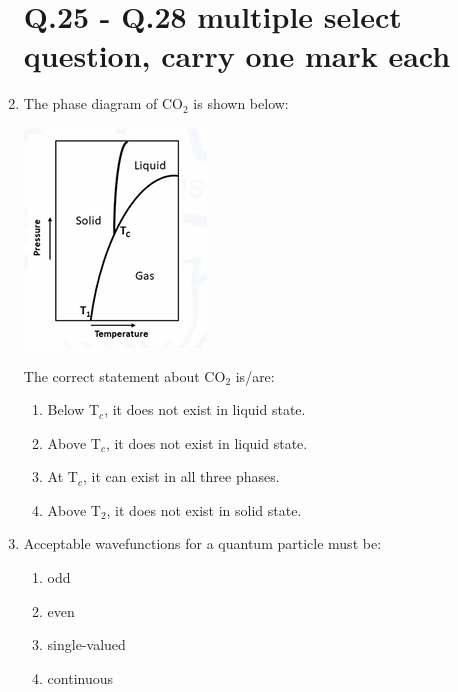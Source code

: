 \documentclass[journal,12pt,onecolumn]{IEEEtran}
\begin{document}
\begin{enumerate}
    \hfill{}
\section*{Q.25 - Q.28 multiple select question, carry one mark each}

    \item The phase diagram of CO$_2$ is shown below:
    \begin{center}
    \includegraphics[width=0.4\columnwidth]{figs/q25.png}
    \end{center}
    The correct statement about CO$_2$ is/are:
    \begin{multicols}{2}
    \begin{enumerate}
        \item Below T$_c$, it does not exist in liquid state.
        \item Above T$_c$, it does not exist in liquid state.
        \item At T$_c$, it can exist in all three phases.
        \item Above T$_2$, it does not exist in solid state.
    \end{enumerate}
    \end{multicols}
    \hfill{}

    \item Acceptable wavefunctions for a quantum particle must be:
    \begin{multicols}{2}
    \begin{enumerate}
        \item odd
        \item even
        \item single-valued
        \item continuous
    \end{enumerate}
    \end{multicols}
    \hfill{}


\end{enumerate}
\end{document}
